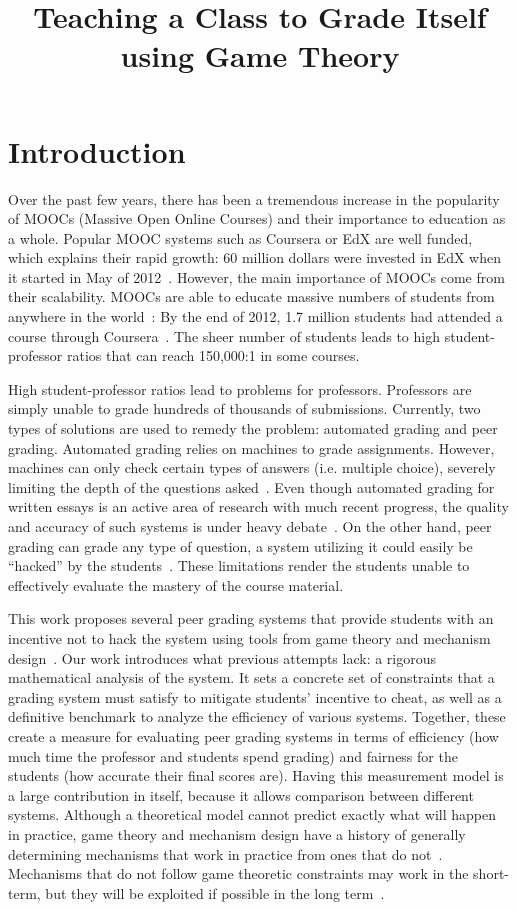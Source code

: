 \documentclass[12pt, Arial]{article}
\title{Teaching a Class to Grade Itself using Game Theory}
\author{}%
\date{}
\begin{document}
\maketitle
\section{Introduction}
Over the past few years, there has been a tremendous increase in the popularity of MOOCs (Massive Open Online Courses) and their importance to education as a whole. Popular MOOC systems such as Coursera or EdX are well funded, which explains their rapid growth: 60 million dollars were invested in EdX when it started in May of 2012~\cite{canmoocsreducecc}. However, the main importance of MOOCs come from their scalability. MOOCs are able to educate massive numbers of students from anywhere in the world~\cite{makingsenseofmoocs}: By the end of 2012, 1.7 million students had attended a course through Coursera~\cite{swotanalysisofmoocs}. The sheer number of students leads to high student-professor ratios that can reach 150,000:1 in some courses.

High student-professor ratios lead to problems for professors. Professors are simply unable to grade hundreds of thousands of submissions. Currently, two types of solutions are used to remedy the problem: automated grading and peer grading. Automated grading relies on machines to grade assignments. However, machines can only check certain types of answers (i.e. multiple choice), severely limiting the depth of the questions asked~\cite{rightandwrongmoocs}. Even though automated grading for written essays is an active area of research with much recent progress, the quality and accuracy of such systems is under heavy debate~\cite{automatedsystemssuck}. On the other hand, peer grading can grade any type of question, a system utilizing it could easily be ``hacked'' by the students~\cite{makingsenseofmoocs}. These limitations render the students unable to effectively evaluate the mastery of the course material. 

This work proposes several peer grading systems that provide students with an incentive not to hack the system using tools from game theory and mechanism design~\cite{AGTbook}. Our work introduces what previous attempts lack: a rigorous mathematical analysis of the system. It sets a concrete set of constraints that a grading system must satisfy to mitigate students' incentive to cheat, as well as a definitive benchmark to analyze the efficiency of various systems. Together, these create a measure for evaluating peer grading systems in terms of efficiency (how much time the professor and students spend grading) and fairness for the students (how accurate their final scores are). Having this measurement model is a large contribution in itself, because it allows comparison between different systems. Although a theoretical model cannot predict exactly what will happen in practice, game theory and mechanism design have a history of generally determining mechanisms that work in practice from ones that do not~\cite{AGTbook}. Mechanisms that do not follow game theoretic constraints may work in the short-term, but they will be exploited if possible in the long term~\cite{boycottfinal}.
\end{document}
